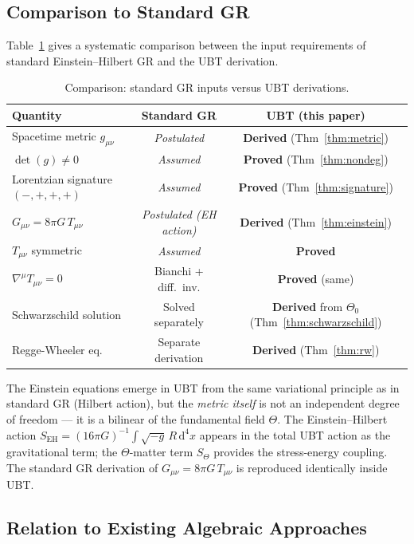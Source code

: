 \documentclass[12pt,a4paper]{article}
\theoremstyle{definition}
\theoremstyle{remark}
\begin{document}
\subsection{Comparison to Standard GR}

Table~\ref{tab:comparison} gives a systematic comparison between the input
requirements of standard Einstein--Hilbert GR and the UBT derivation.

\begin{table}[ht]
\centering
\caption{Comparison: standard GR inputs versus UBT derivations.}
\label{tab:comparison}
\begin{tabular}{lcc}
\toprule
\textbf{Quantity} & \textbf{Standard GR} & \textbf{UBT (this paper)} \\
\midrule
Spacetime metric $g_{\mu\nu}$ & \emph{Postulated} & \textbf{Derived} (Thm~\ref{thm:metric}) \\
$\det(g) \neq 0$ & \emph{Assumed} & \textbf{Proved} (Thm~\ref{thm:nondeg}) \\
Lorentzian signature $(-,+,+,+)$ & \emph{Assumed} & \textbf{Proved} (Thm~\ref{thm:signature}) \\
$G_{\mu\nu} = 8\pi G\,T_{\mu\nu}$ & \emph{Postulated (EH action)} & \textbf{Derived} (Thm~\ref{thm:einstein}) \\
$T_{\mu\nu}$ symmetric & \emph{Assumed} & \textbf{Proved} \\
$\nabla^\mu T_{\mu\nu} = 0$ & Bianchi + diff.\ inv. & \textbf{Proved} (same) \\
Schwarzschild solution & Solved separately & \textbf{Derived} from $\Theta_0$ (Thm~\ref{thm:schwarzschild}) \\
Regge-Wheeler eq. & Separate derivation & \textbf{Derived} (Thm~\ref{thm:rw}) \\
\bottomrule
\end{tabular}
\end{table}

The Einstein equations emerge in UBT from the same variational principle as
in standard GR (Hilbert action), but the \emph{metric itself} is not an
independent degree of freedom --- it is a bilinear of the fundamental field
$\Theta$.
The Einstein--Hilbert action $S_{\mathrm{EH}} = (16\pi G)^{-1}\int\!\sqrt{-g}\,R\,\mathrm{d}^4x$
appears in the total UBT action as the gravitational term; the $\Theta$-matter
term $S_\Theta$ provides the stress-energy coupling.
The standard GR derivation of $G_{\mu\nu} = 8\pi G\,T_{\mu\nu}$ is
reproduced identically inside UBT.

\subsection{Relation to Existing Algebraic Approaches}
\end{document}
